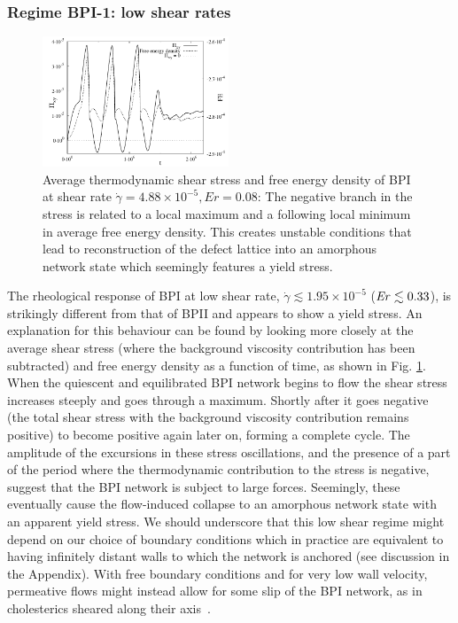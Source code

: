 \documentclass[8.5pt,twoside,twocolumn]{article}
\newcommand{\e}[1]{\times10^{#1}}
\newcommand{\gd}{\dot{\gamma}}
\begin{document}
\subsubsection{Regime BPI-1: low shear rates }

\begin{figure}[htpb]
\includegraphics[width=0.495\textwidth]{stress_fe_yield_bp1.pdf}
\caption{Average thermodynamic shear stress and free energy density of BPI at shear rate 
$\gd=4.88\e{-5}, Er=0.08$: The negative branch in the stress is related to a local maximum and a following local 
minimum in average free energy density. This creates unstable conditions that lead 
to reconstruction of the defect lattice into an amorphous network state which 
seemingly features a yield stress.}
\label{bp1-fe-yield}
\end{figure}



The rheological response of BPI at low shear rate, $\gd\lesssim1.95\e{-5}$
(${\it Er} \lesssim 0.33$), 
is strikingly different from that of BPII and appears to show a
yield stress. An explanation for this behaviour can be found by 
looking more closely at the average shear stress (where the
background viscosity contribution has been subtracted) and 
free energy density as a function of time, as shown in Fig. \ref{bp1-fe-yield}.
When the quiescent and equilibrated BPI network begins to flow
the shear stress increases steeply and goes through a maximum.
Shortly after it goes negative (the total shear stress 
with the background viscosity contribution remains positive) 
to become positive again later on, forming a complete cycle.
The amplitude of the excursions in these stress oscillations, and
the presence of a part of the period where the thermodynamic
contribution to the stress is negative, suggest that the
BPI network is subject to large forces. Seemingly, these eventually
cause the flow-induced collapse to an amorphous network state with
an apparent yield stress. We should underscore that this
low shear regime might depend on our choice of boundary
conditions which in practice are equivalent to having infinitely
distant walls to which the network is anchored (see discussion
in the Appendix).
With free boundary conditions and for very low wall velocity, 
permeative flows might instead allow for
some slip of the BPI network, as in cholesterics sheared
along their axis~\cite{Marenduzzo:2006b}.
\end{document}
